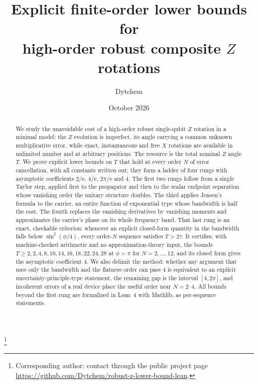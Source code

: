 \documentclass[%
  aps,
  pra,
  preprint,
  superscriptaddress,
  amsmath,amssymb,
  nofootinbib,
  floatfix,
]{revtex4-2}
\theoremstyle{definition}
\theoremstyle{remark}
\newcommand{\e}{\mathrm e}
\begin{document}
\title{Explicit finite-order lower bounds for\\
high-order robust composite $Z$ rotations}

\author{Dytchem}
\thanks{Corresponding author: contact through the public project page
\url{https://github.com/Dytchem/robust-z-lower-bound-lean}.}
\date{October 2026}

\begin{abstract}
We study the unavoidable cost of a high-order robust single-qubit $Z$ rotation in a
minimal model: the $Z$ evolution is imperfect, its angle carrying a common unknown
multiplicative error, while exact, instantaneous and free $X$ rotations are available in
unlimited number and at arbitrary positions. The resource is the total nominal $Z$ angle
$T$. We prove explicit lower bounds on $T$ that hold at every order $N$ of error
cancellation, with all constants written out; they form a ladder of four rungs with
asymptotic coefficients $2/\e$, $4/\e$, $2\pi/\e$ and $4$. The first two rungs follow from a
single Taylor step, applied first to the propagator and then to the scalar endpoint
separation whose vanishing order the unitary structure doubles. The third applies Jensen's
formula to the carrier, an entire function of exponential type whose bandwidth is half the
cost. The fourth replaces the vanishing derivatives by vanishing moments and approximates
the carrier's phase on its whole frequency band. That last rung is an exact, checkable
criterion: whenever an explicit closed-form quantity in the bandwidth falls below
$\sin^2(\phi/4)$, every order-$N$ sequence satisfies $T>2\tau$. It certifies, with
machine-checked arithmetic and no approximation-theory input, the bounds
$T\ge2,2,4,8,10,14,16,18,22,24,28$ at $\phi=\pi$ for $N=2,\dots,12$, and its closed form
gives the asymptotic coefficient $4$. We also delimit the method: whether any argument
that uses only the bandwidth and the flatness order can pass $4$ is equivalent to an explicit
uncertainty-principle-type statement, the remaining gap is the interval $[4,2\pi]$, and
incoherent errors of a real device place the useful order near $N=2$--$4$. All bounds beyond the first rung are formalized in Lean~4 with Mathlib, as per-sequence
statements.
\end{abstract}


\maketitle
\end{document}
